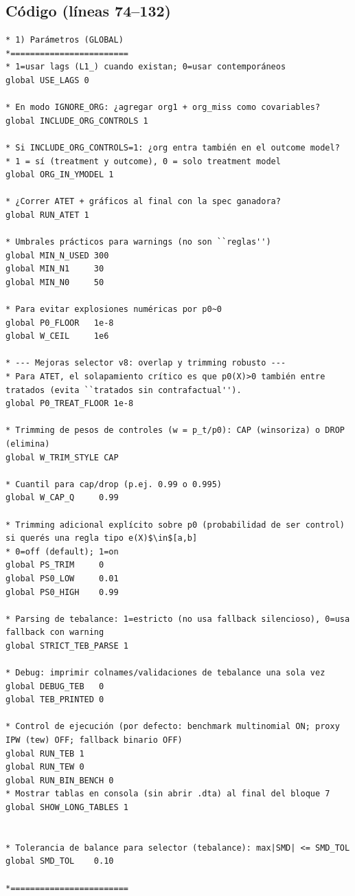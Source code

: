 \documentclass[12pt]{article}
\begin{document}
\subsection*{Código (líneas 74--132)}
\begin{lstlisting}
* 1) Parámetros (GLOBAL) 
*========================
* 1=usar lags (L1_) cuando existan; 0=usar contemporáneos
global USE_LAGS 0

* En modo IGNORE_ORG: ¿agregar org1 + org_miss como covariables?
global INCLUDE_ORG_CONTROLS 1

* Si INCLUDE_ORG_CONTROLS=1: ¿org entra también en el outcome model?
* 1 = sí (treatment y outcome), 0 = solo treatment model
global ORG_IN_YMODEL 1

* ¿Correr ATET + gráficos al final con la spec ganadora?
global RUN_ATET 1

* Umbrales prácticos para warnings (no son ``reglas'')
global MIN_N_USED 300
global MIN_N1     30
global MIN_N0     50

* Para evitar explosiones numéricas por p0~0
global P0_FLOOR   1e-8
global W_CEIL     1e6

* --- Mejoras selector v8: overlap y trimming robusto ---
* Para ATET, el solapamiento crítico es que p0(X)>0 también entre tratados (evita ``tratados sin contrafactual'').
global P0_TREAT_FLOOR 1e-8

* Trimming de pesos de controles (w = p_t/p0): CAP (winsoriza) o DROP (elimina)
global W_TRIM_STYLE CAP

* Cuantil para cap/drop (p.ej. 0.99 o 0.995)
global W_CAP_Q     0.99

* Trimming adicional explícito sobre p0 (probabilidad de ser control) si querés una regla tipo e(X)$\in$[a,b]
* 0=off (default); 1=on
global PS_TRIM     0
global PS0_LOW     0.01
global PS0_HIGH    0.99

* Parsing de tebalance: 1=estricto (no usa fallback silencioso), 0=usa fallback con warning
global STRICT_TEB_PARSE 1

* Debug: imprimir colnames/validaciones de tebalance una sola vez
global DEBUG_TEB   0
global TEB_PRINTED 0

* Control de ejecución (por defecto: benchmark multinomial ON; proxy IPW (tew) OFF; fallback binario OFF)
global RUN_TEB 1
global RUN_TEW 0
global RUN_BIN_BENCH 0
* Mostrar tablas en consola (sin abrir .dta) al final del bloque 7
global SHOW_LONG_TABLES 1


* Tolerancia de balance para selector (tebalance): max|SMD| <= SMD_TOL
global SMD_TOL    0.10

*========================
\end{lstlisting}
\end{document}
